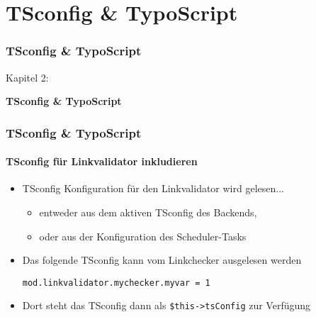 %

\section{TSconfig \& TypoScript}
\begin{frame}[fragile]
	\frametitle{TSconfig \& TypoScript}

	\begin{center}\huge{Kapitel 2:}\end{center}
	\begin{center}\huge{\color{typo3darkgrey}\textbf{TSconfig \& TypoScript}}\end{center}

\end{frame}


\begin{frame}[fragile]
	\frametitle{TSconfig \& TypoScript}
	\framesubtitle{TSconfig für Linkvalidator inkludieren}

	\begin{itemize}
		\item TSconfig Konfiguration für den Linkvalidator wird gelesen...

			\begin{itemize}
				\item entweder aus dem aktiven TSconfig des Backends,
				\item oder aus der Konfiguration des Scheduler-Tasks
			\end{itemize}

		\item Das folgende TSconfig kann vom Linkchecker ausgelesen werden

			\lstinline!mod.linkvalidator.mychecker.myvar = 1!

		\item Dort steht das TSconfig dann als \texttt{\$this->tsConfig} zur Verfügung
	\end{itemize}

\end{frame}

